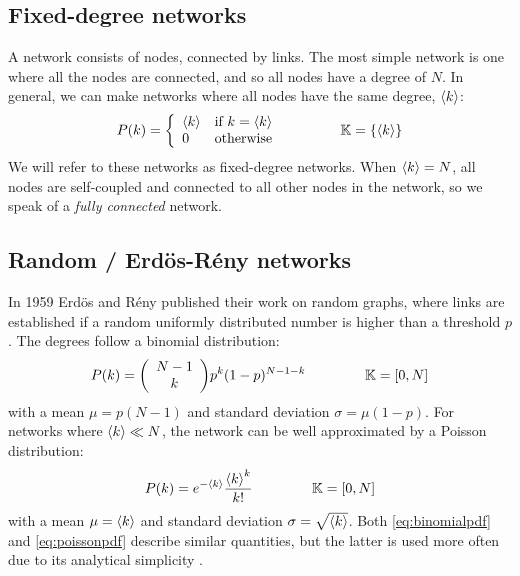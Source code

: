 \subsection{Fixed-degree networks}
\noindent A network consists of nodes, connected by links. The most simple network is one where all the nodes are connected, and so all nodes have a degree of $N$. In general, we can make networks where all nodes have the same degree, ${\langle k\rangle}$:
\begin{align}
P(k) = \left\{\begin{array}{ll}\kmean & \text{if } k=\kmean \\0 & \text{otherwise}\end{array}\right. \hspace{15mm} \K = \{ \kmean \} \label{eq:diracpdf}
\end{align}
We will refer to these networks as fixed-degree networks. When ${\langle k\rangle} = N$, all nodes are self-coupled and connected to all other nodes in the network, so we speak of a \textsl{fully connected} network. 


\subsection{Random / Erd{\"o}s-R{\'e}ny networks}
In 1959 Erd{\"o}s and R{\'e}ny published their work on random graphs\cite{RandomGraphs1959}, where links are established if a random uniformly distributed number is higher than a threshold $p$. The degrees follow a binomial distribution: 
\begin{align}
P(k)=\left(\begin{array}{c}N-1 \\ k\end{array}\right) p^{k}(1-p)^{N-1-k}  \hspace{15mm} \K = [0,N] \label{eq:binomialpdf}
\end{align}
with a mean $\mu = p(N-1)$ and standard deviation $\sigma = \mu(1-p)$. For networks where ${\langle k\rangle} \ll N$, the network can be well approximated by a Poisson distribution:
\begin{align}
P(k) = e^{-\kmean} \frac{\kmean^{k}}{k !} \hspace{15mm} \K = [0,N] \label{eq:poissonpdf}
\end{align}
with a mean $\mu = {\langle k\rangle}$ and standard deviation $\sigma = \sqrt{{\langle k\rangle}}$. Both \eqref{eq:binomialpdf} and \eqref{eq:poissonpdf} describe similar quantities, but the latter is used more often due to its analytical simplicity \cite{BarabasiNetworkBook2016}.


